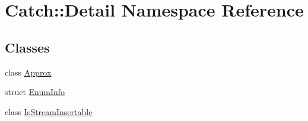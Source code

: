 \hypertarget{namespace_catch_1_1_detail}{}\section{Catch\+:\+:Detail Namespace Reference}
\label{namespace_catch_1_1_detail}
\subsection*{Classes}
\begin{DoxyCompactItemize}
\item 
class \mbox{\hyperlink{class_catch_1_1_detail_1_1_approx}{Approx}}
\item 
struct \mbox{\hyperlink{struct_catch_1_1_detail_1_1_enum_info}{Enum\+Info}}
\item 
class \mbox{\hyperlink{class_catch_1_1_detail_1_1_is_stream_insertable}{Is\+Stream\+Insertable}}
\end{DoxyCompactItemize}
